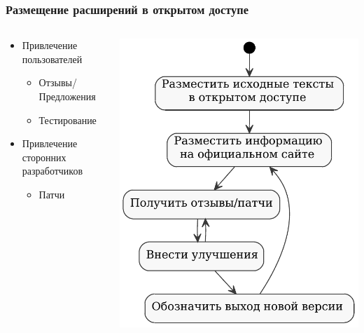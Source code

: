 \documentclass[unicode]{beamer}
\begin{document}
\begin{frame}
\transwipe[direction=90]
\frametitle{Размещение расширений в открытом доступе}
\begin{columns}
\begin{column}{0.6\textwidth}
\begin{block}{}
\begin{itemize} 
  \item Привлечение пользователей
  \begin{itemize}
  	\item Отзывы/Предложения
  	\item Тестирование 
  \end{itemize}
  \item Привлечение сторонних разработчиков	
  \begin{itemize}
  \item Патчи
  \end{itemize}  
\end{itemize}
\end{block}
\end{column}
\begin{column}{0.4\textwidth}
\centerline{\includegraphics[width=1\textwidth]{opensource-feedback.pdf}}
\end{column}
\end{columns}
\end{frame}
\end{document}

